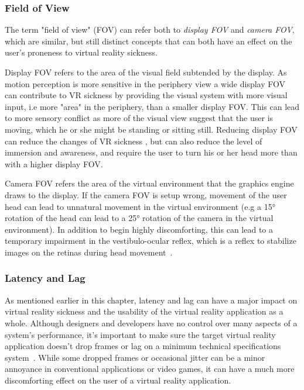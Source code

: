 \subsubsection{Field of View}
\label{sec:fov}
The term "field of view" (FOV) can refer both to \textit{display FOV} and \textit{camera FOV}, which are similar, 
but still distinct concepts that can both have an effect on the user's proneness to virtual reality sickness. 

Display FOV refers to the area of the visual field subtended by the display. As motion perception is more sensitive in the periphery view 
a wide display FOV can contribute to VR sickness by providing the visual system with more visual input, i.e more "area" in the periphery, than a smaller display FOV. 
This can lead to more sensory conflict as more of the visual view suggest that the user is moving, which he or she might be standing or sitting still.
Reducing display FOV can reduce the changes of VR sickness \citep{Draper2001}, but can also reduce the level of immersion and awareness, and require the user to turn his or her head more
than with a higher display FOV.

Camera FOV refers the area of the virtual environment that the graphics engine draws to the display.
If the camera FOV is setup wrong, movement of the user head can lead to unnatural movement in the virtual environment (e.g a 15° rotation of the head can lead to a 
25° rotation of the camera in the virtual environment). In addition to begin highly discomforting, this can lead to a temporary impairment in the vestibulo-ocular reflex, 
which is a reflex to stabilize images on the retinas during head movement~\citep{Stanney2002}.

\subsubsection{Latency and Lag}
As mentioned earlier in this chapter, latency and lag can have a major impact on virtual reality sickness and the usability of the virtual reality application as a whole.
Although designers and developers have no control over many aspects of a system's performance, it's important to make sure the target virtual reality application
doesn't drop frames or lag on a minimum technical specifications system~\citep{OCULUS2016}. While some dropped frames or occasional jitter can be a minor annoyance
in conventional applications or video games, it can have a much more discomforting effect on the user of a virtual reality application. 

